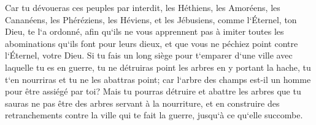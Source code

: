 \verse Car tu dévoueras ces peuples par interdit, les Héthiens, les Amoréens, les Cananéens, les Phéréziens, les Héviens, et les Jébusiens, comme l`Éternel, ton Dieu, te l`a ordonné, 
\verse afin qu`ils ne vous apprennent pas à imiter toutes les abominations qu`ils font pour leurs dieux, et que vous ne péchiez point contre l`Éternel, votre Dieu. 
\verse Si tu fais un long siège pour t`emparer d`une ville avec laquelle tu es en guerre, tu ne détruiras point les arbres en y portant la hache, tu t`en nourriras et tu ne les abattras point; car l`arbre des champs est-il un homme pour être assiégé par toi? 
\verse Mais tu pourras détruire et abattre les arbres que tu sauras ne pas être des arbres servant à la nourriture, et en construire des retranchements contre la ville qui te fait la guerre, jusqu`à ce qu`elle succombe. 

